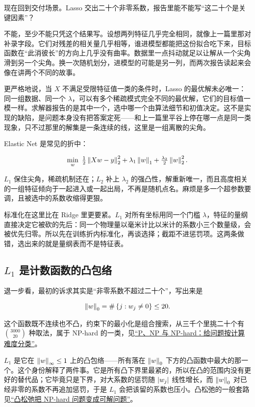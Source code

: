 现在回到交付场景。Lasso 交出二十个非零系数，报告里能不能写``这二十个是关键因素''？

不能，至少不能只凭这个结果写。设想两列特征几乎完全相同，就像上一篇里那对补录字段。它们对残差的相关量几乎相等，谁进模型都能把这份拟合吃下来，目标函数在``此消彼长''的方向上几乎没有曲率。数据里一点抖动就足以让解从一个尖角滑到另一个尖角。换一次随机划分，进模型的可能是另一列，而两次报告读起来会像在讲两个不同的故事。

更严格地说，当 \(X\) 不满足受限特征值一类的条件时，Lasso 的最优解未必唯一：同一组数据、同一个 \(\lambda\)，可以有多个稀疏模式完全不同的最优解，它们的目标值一模一样。求解器报告的是其中一个，选中哪一个由算法细节和初值决定。这不是实现的缺陷，是问题本身没有把答案定死——和上一篇里平谷上停在哪一点是同一类现象，只不过那里的解集是一条连续的线，这里是一组离散的尖角。

Elastic Net 是常见的折中：

\[
\min_w\ \tfrac12\norm{Xw-y}_2^2+\lambda_1\norm{w}_1+\tfrac{\lambda_2}{2}\norm{w}_2^2 .
\]

\(L_1\) 保住尖角，稀疏机制还在；\(L_2\) 补上 \(\lambda_2\) 的强凸性，解重新唯一，而且高度相关的一组特征倾向于一起进入或一起出局，不再是随机点名。麻烦是多一个超参数要调，且被选中的系数收缩得更狠。

标准化在这里比在 Ridge 里更要紧。\(L_1\) 对所有坐标用同一个门槛 \(\lambda\)，特征的量纲直接决定它被砍的先后：同一个物理量以毫米计比以米计的系数小三个数量级，会被优先归零。所以先在训练折内标准化，再谈选择；截距不进惩罚项。这两条做错，选出来的就是量纲表而不是特征表。

\subsection{\texorpdfstring{\(L_1\) 是计数函数的凸包络}{L1 是计数函数的凸包络}}

退一步看，最初的诉求其实是``非零系数不超过二十个''，写出来是

\[
\left\lVert w\right\rVert_0=\#\left\{j:w_j\ne0\right\}\le 20 .
\]

这个函数既不连续也不凸，约束下的最小化是组合搜索，从三千个里挑二十个有 \(\binom{3000}{20}\) 种取法，属于 NP-hard 的一类，见\hyperref[sec:09-Convex-Optimization/09-Complexity-and-Approximation/01]{``P、NP 与 NP-hard：给问题按计算难度分类''}。

\(L_1\) 是它在 \(\left\lVert w\right\rVert_\infty\le1\) 上的凸包络——所有落在 \(\left\lVert w\right\rVert_0\) 下方的凸函数中最大的那一个。这个身份解释了两件事。它是所有凸下界里最紧的，所以在凸的范围内没有更好的替代品；它毕竟只是下界，对大系数的惩罚随 \(\left|w_j\right|\) 线性增长，而 \(\left\lVert w\right\rVert_0\) 对已经非零的系数不再追加惩罚，于是 \(L_1\) 会把该留的系数也压小。凸松弛的一般套路见\hyperref[sec:09-Convex-Optimization/09-Complexity-and-Approximation/02]{``凸松弛把 NP-hard 问题变成可解问题''}。

